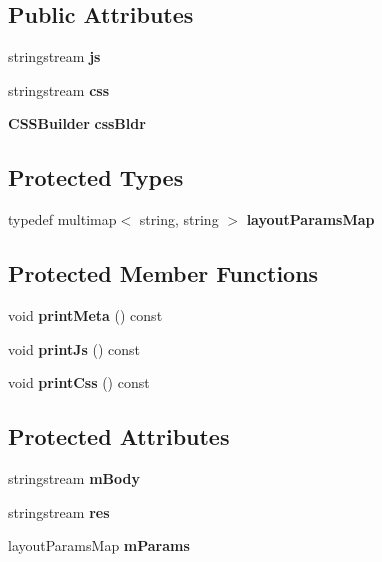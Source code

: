 \subsection*{Public Attributes}
\begin{CompactItemize}
\item 
stringstream \textbf{js}\label{classCGILayout_033c41fe758e78d0f185f398f9ba48af}

\item 
stringstream \textbf{css}\label{classCGILayout_c6b8de6c57be3dc52e1689d5828430fb}

\item 
{\bf CSSBuilder} \textbf{cssBldr}\label{classCGILayout_53ee20645aa48b21f0bbeb90422a6e07}

\end{CompactItemize}
\subsection*{Protected Types}
\begin{CompactItemize}
\item 
typedef multimap$<$ string, string $>$ \textbf{layoutParamsMap}\label{classCGILayout_a8e4c0ba8f2d4ffd61d23113d79ac10e}

\end{CompactItemize}
\subsection*{Protected Member Functions}
\begin{CompactItemize}
\item 
void \textbf{printMeta} () const \label{classCGILayout_7a29bfc1454394426d336a36dbc793f3}

\item 
void \textbf{printJs} () const \label{classCGILayout_845949a079eb1d4edaa73e1cef2f437f}

\item 
void \textbf{printCss} () const \label{classCGILayout_82fa8c3fbf3e07779780dcb522fb6da8}

\end{CompactItemize}
\subsection*{Protected Attributes}
\begin{CompactItemize}
\item 
stringstream \textbf{mBody}\label{classCGILayout_06a766aacec0eab649552bf3c56957b9}

\item 
stringstream \textbf{res}\label{classCGILayout_ba13cd890ab3133f2c4c97a714cc3be0}

\item 
layoutParamsMap \textbf{mParams}\label{classCGILayout_9584075749fd10732c6b6175161bc0f5}

\end{CompactItemize}


